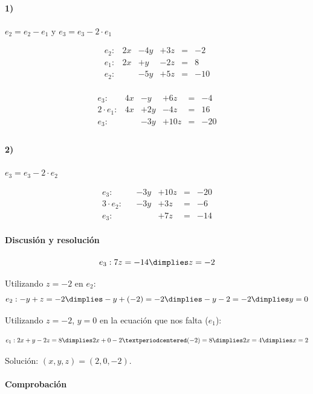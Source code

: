 \documentclass[palatino,nosec]{Docencia}
\begin{document}
\begin{problem}
\paragraph{1)} $e_2 = e_2-e_1$ y $e_3 = e_3-2·e_1$

\[
\begin{array}{rccccc}
e_2: &	2x &	-	4y &	+ 3z &	= & -2 \\
e_1: &	2x &	+	y  &	- 2z &	= & 8 \\
\hline
e_2: &	   &	-	5y &	+ 5z &	= & -10\\
\end{array}
\]	


\[
\begin{array}{rccccc}
e_3:   &	4x &	-	y   &	+ 6z &	= & -4 \\
2·e_1: &	4x &	+	2y  &	- 4z &	= & 16 \\
\hline
e_3:   &	   &	-	3y &	+ 10z &	= & -20\\
\end{array}
\]	


\paragraph{2)} $e_3 = e_3-2·e_2$

\[
\begin{array}{rccccc}
e_3: &	   &	-	3y &	+ 10z &	= & -20\\
3·e_2: &   &	-	3y &	+  3z &	= & -6\\
\hline
e_3: &	   &		   &	+  7z & = &-14
\end{array}
\]	


\paragraph{Discusión y resolución}

\[e_3: 7z=-14 \dimplies z=-2\]


Utilizando $z=-2$ en $e_2$:
\[e_2: -y+z=-2 \dimplies -y + (-2) = -2 \dimplies -y-2=-2 \dimplies y=0\]

Utilizando $z=-2$, $y=0$ en la ecuación que nos falta ($e_1$):

\[
e_1: 2x	+ y - 2z = 8 \dimplies 2x + 0 - 2·(-2) = 8 \dimplies 2x=4 \dimplies x=2
\]


Solución: $(x,y,z) = (2,0,-2)$.

\paragraph{Comprobación}


\end{problem}
\end{document}
